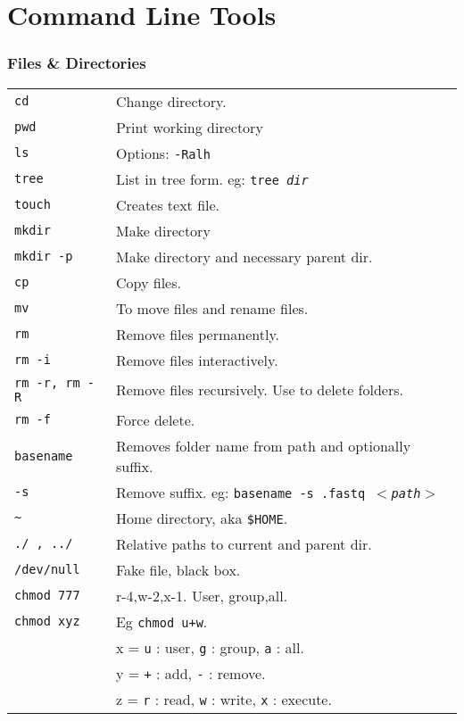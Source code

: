 \section{Command Line Tools}

\subsubsection{Files \& Directories}

\begin{tabularx}{\linewidth}{lX}
    \texttt{cd} & Change directory.\\
    \texttt{pwd} & Print working directory\\
    \texttt{ls} & Options: \texttt{-Ralh} \\
    \texttt{tree} & List in tree form. eg: \texttt{tree \textit{dir}}\\
    \hline

    \texttt{touch} & Creates text file. \\
    \texttt{mkdir} & Make directory\\
    \texttt{mkdir -p} & Make directory and necessary parent dir.\\
    \texttt{cp} & Copy files.\\
    \texttt{mv} & To move files and rename files.\\
    \texttt{rm} & Remove files permanently. \\
    \texttt{rm -i} & Remove files interactively. \\
    \texttt{rm -r, rm -R} & Remove files recursively. Use to delete folders.\\
    \texttt{rm -f} & Force delete.\\
    \texttt{basename} & Removes folder name from path and optionally  suffix.\\
    \texttt{-s} & Remove suffix. eg: \texttt{basename -s .fastq $<$\textit{path}$>$}\\
    \hline

    \texttt{\~} & Home directory, aka \texttt{\$HOME}.\\
    \texttt{./ , ../} & Relative paths to current and parent dir.\\
    \texttt{/dev/null} & Fake file, black box.\\ 
    \hline

    \texttt{chmod 777}              & r-4,w-2,x-1. User, group,all.  \\
    \texttt{chmod xyz}              & Eg \texttt{chmod u+w}.\\
                                    & x = \texttt{u} : user, \texttt{g} : group, \texttt{a} : all.\\
                                    & y = \texttt{+} : add, \texttt{-} : remove.\\
                                    & z = \texttt{r} : read, \texttt{w} : write, \texttt{x} : execute.\\
    \hline


\end{tabularx}
